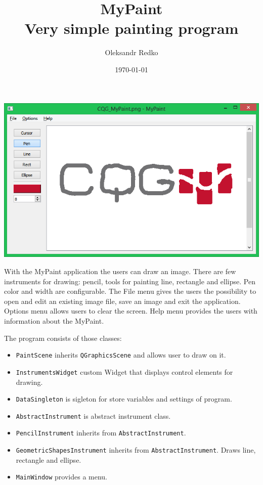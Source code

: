 \documentclass[a4paper, 14pt]{extreport}
\title{MyPaint\\
\vspace{2mm}
{\large Very simple painting program}}
\author{Oleksandr Redko}
\date{\today}
\begin{document}
	
	\maketitle
	\setcounter{page}{2}
	
	\noindent\includegraphics[width=\textwidth]{CQG_MyPaint_window.png}
	
	With the \textsf{MyPaint} application the users can draw an image.
	There are few instruments for drawing: pencil, tools for painting line, rectangle and ellipse.
	Pen color and width are configurable.
	The \textsf{File} menu gives the users the possibility to open and edit an existing image file, save an image and exit the application.
	\textsf{Options} menu allows users to clear the screen.
	\textsf{Help} menu provides the users with information about the \textsf{MyPaint}.
	
	The program consists of those classes:
	\begin{itemize}
		\item \texttt{PaintScene} inherits \texttt{QGraphicsScene} and allows user to draw on it.
		\item \texttt{InstrumentsWidget} custom Widget that displays control elements for drawing.
		\item \texttt{DataSingleton} is sigleton for store variables and settings of program.
		\item \texttt{AbstractInstrument} is abstract instrument class.
		\item \texttt{PencilInstrument} inherits from \texttt{AbstractInstrument}. 
		\item \texttt{GeometricShapesInstrument} inherits from \texttt{AbstractInstrument}. Draws line, rectangle and ellipse.
		\item \texttt{MainWindow} provides a menu.\textbf{}
	\end{itemize}
	
\end{document}
